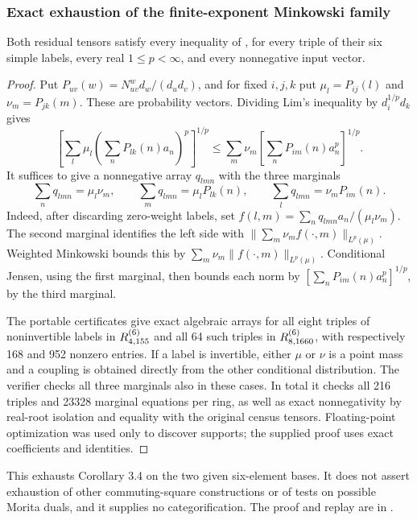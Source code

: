 \subsubsection{Exact exhaustion of the finite-exponent Minkowski family}
\begin{proposition}
Both residual tensors satisfy every inequality of \cite[Corollary 3.4]{Lim}, for every triple of their six simple labels, every real $1\le p<\infty$, and every nonnegative input vector.
\end{proposition}
\begin{proof}
Put $P_{uv}(w)=N_{uv}^{w}d_w/(d_ud_v)$, and for fixed $i,j,k$ put $\mu_l=P_{ij}(l)$ and $\nu_m=P_{jk}(m)$. These are probability vectors. Dividing Lim's inequality by $d_i^{1/p}d_k$ gives
\[
 \left[\sum_l\mu_l\left(\sum_nP_{lk}(n)a_n\right)^p\right]^{1/p}
 \le \sum_m\nu_m\left[\sum_nP_{im}(n)a_n^p\right]^{1/p}.
\]
It suffices to give a nonnegative array $q_{lmn}$ with the three marginals
\[
 \sum_nq_{lmn}=\mu_l\nu_m,\qquad
 \sum_mq_{lmn}=\mu_lP_{lk}(n),\qquad
 \sum_lq_{lmn}=\nu_mP_{im}(n).
\]
Indeed, after discarding zero-weight labels, set
$f(l,m)=\sum_nq_{lmn}a_n/(\mu_l\nu_m)$.
The second marginal identifies the left side with
$\|\sum_m\nu_mf(\cdot,m)\|_{L^p(\mu)}$.
Weighted Minkowski bounds this by $\sum_m\nu_m\|f(\cdot,m)\|_{L^p(\mu)}$.
Conditional Jensen, using the first marginal, then bounds each norm by
$[\sum_nP_{im}(n)a_n^p]^{1/p}$, by the third marginal.

The portable certificates give exact algebraic arrays for all eight triples of noninvertible labels in $R^{(6)}_{4,155}$ and all 64 such triples in $R^{(6)}_{8,1660}$, with respectively 168 and 952 nonzero entries. If a label is invertible, either $\mu$ or $\nu$ is a point mass and a coupling is obtained directly from the other conditional distribution. The verifier checks all three marginals also in these cases. In total it checks all 216 triples and 23328 marginal equations per ring, as well as exact nonnegativity by real-root isolation and equality with the original census tensors. Floating-point optimization was used only to discover supports; the supplied proof uses exact coefficients and identities.
\end{proof}
This exhausts Corollary 3.4 on the two given six-element bases. It does not assert exhaustion of other commuting-square constructions or of tests on possible Morita duals, and it supplies no categorification. The proof and replay are in
.

